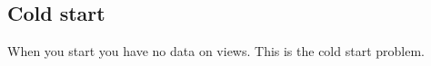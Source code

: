 
\subsection{Cold start}

When you start you have no data on views. This is the cold start problem.

